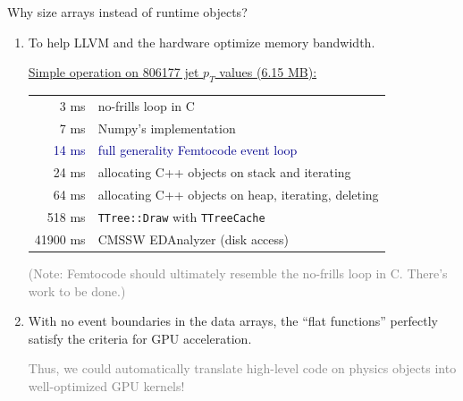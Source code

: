 \documentclass{beamer}
\begin{document}
\begin{frame}{Why size arrays instead of runtime objects?}
\vspace{0.4 cm}
\begin{enumerate}\setlength{\itemsep}{0.2 cm}
\item To help LLVM and the hardware optimize memory bandwidth.

\vspace{0.2 cm}
\underline{Simple operation on 806177 jet $p_T$ values (6.15 MB):}

\vspace{-0.4 cm}
\begin{center}
\begin{tabular}{r l}
3 ms & no-frills loop in C \\
7 ms & Numpy's implementation \\
\textcolor{darkblue}{14 ms} & \textcolor{darkblue}{full generality Femtocode event loop} \\
24 ms & allocating C++ objects on stack and iterating \\
64 ms & allocating C++ objects on heap, iterating, deleting \\
518 ms & {\tt TTree::Draw} with {\tt TTreeCache} \\
41900 ms & CMSSW EDAnalyzer (disk access)
\end{tabular}
\end{center}

\textcolor{gray}{(Note: Femtocode should ultimately resemble the no-frills loop in C. There's work to be done.)}

\item<2-> With no event boundaries in the data arrays, the ``flat functions'' perfectly satisfy the criteria for GPU acceleration.

\vspace{0.1 cm}
\textcolor{gray}{Thus, we could automatically translate high-level code on physics objects into well-optimized GPU kernels!}
\end{enumerate}
\end{frame}
\end{document}
